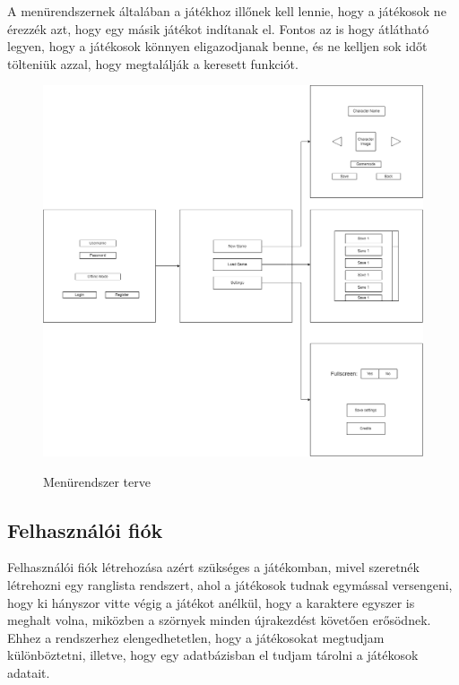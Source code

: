 \indent \indent A menürendszernek általában a játékhoz illőnek kell lennie, hogy a játékosok ne érezzék azt, hogy egy másik játékot indítanak el. Fontos az is hogy átlátható legyen, hogy a játékosok könnyen eligazodjanak benne, és ne kelljen sok időt tölteniük azzal, hogy megtalálják a keresett funkciót.

\begin{figure}[H]
    \centering
    \includegraphics[width=14.0truecm]{images/MS_menu.drawio.png}
    \caption{Menürendszer terve}
    \label{fig:Menürendszer terve}\cite{Menürendszer-terve}
\end{figure}

\subsection{Felhasználói fiók}
\indent \indent Felhasználói fiók létrehozása azért szükséges a játékomban, mivel szeretnék létrehozni egy ranglista rendszert, ahol a játékosok tudnak egymással versengeni, hogy ki hányszor vitte végig a játékot anélkül, hogy a karaktere egyszer is meghalt volna, miközben a szörnyek minden újrakezdést követően erősödnek. Ehhez a rendszerhez elengedhetetlen, hogy a játékosokat megtudjam különböztetni, illetve, hogy egy adatbázisban el tudjam tárolni a játékosok adatait.

